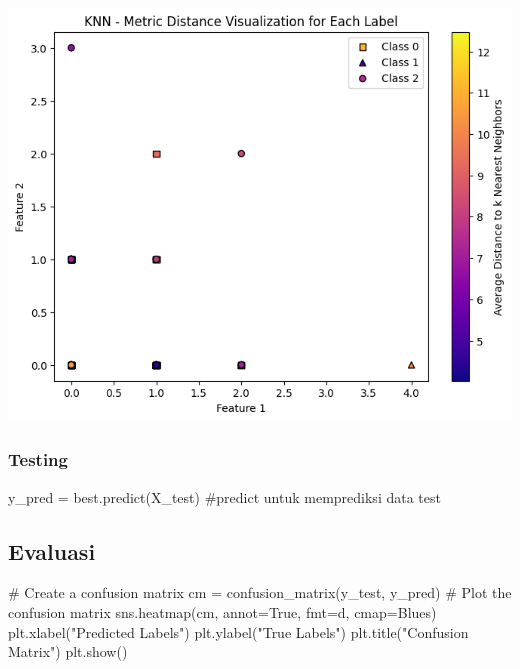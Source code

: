 \documentclass[
  letterpaper,
  DIV=11,
  numbers=noendperiod]{scrreprt}
\newenvironment{Shaded}{\begin{snugshade}}{\end{snugshade}}
\newcommand{\CommentTok}[1]{\textcolor[rgb]{0.37,0.37,0.37}{#1}}
\newcommand{\NormalTok}[1]{\textcolor[rgb]{0.00,0.23,0.31}{#1}}
\newcommand{\OperatorTok}[1]{\textcolor[rgb]{0.37,0.37,0.37}{#1}}
\newcommand{\StringTok}[1]{\textcolor[rgb]{0.13,0.47,0.30}{#1}}
\newcommand{\VariableTok}[1]{\textcolor[rgb]{0.07,0.07,0.07}{#1}}
\begin{document}
\includegraphics{Asset/plt_sift_knndistance_optimasi.png}

\hypertarget{testing-1}{%
\subsubsection*{Testing}\label{testing-1}}

\begin{Shaded}
\begin{Highlighting}[]
\NormalTok{y\_pred }\OperatorTok{=}\NormalTok{ best.predict(X\_test) }\CommentTok{\#predict untuk memprediksi data test}
\end{Highlighting}
\end{Shaded}

\hypertarget{evaluasi-3}{%
\subsection*{Evaluasi}\label{evaluasi-3}}

\begin{Shaded}
\begin{Highlighting}[]
\CommentTok{\# Create a confusion matrix}
\NormalTok{cm }\OperatorTok{=}\NormalTok{ confusion\_matrix(y\_test, y\_pred)}
\CommentTok{\# Plot the confusion matrix}
\NormalTok{sns.heatmap(cm, annot}\OperatorTok{=}\VariableTok{True}\NormalTok{, fmt}\OperatorTok{=}\StringTok{\textquotesingle{}d\textquotesingle{}}\NormalTok{, cmap}\OperatorTok{=}\StringTok{\textquotesingle{}Blues\textquotesingle{}}\NormalTok{)}
\NormalTok{plt.xlabel(}\StringTok{"Predicted Labels"}\NormalTok{)}
\NormalTok{plt.ylabel(}\StringTok{"True Labels"}\NormalTok{)}
\NormalTok{plt.title(}\StringTok{"Confusion Matrix"}\NormalTok{)}
\NormalTok{plt.show()}
\end{Highlighting}
\end{Shaded}
\end{document}
